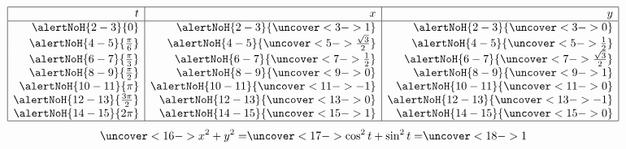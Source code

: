 \begin{frame}
\begin{example}
\begin{columns}[c]
\[
\begin{array}{|r|r|r|}
\hline
t & x & y\\
\hline
\alertNoH{ 2-3}{0} &%
\alertNoH{ 2-3}{\uncover<3->{1}} &%
\alertNoH{ 2-3}{\uncover<3->{0}} \\%
\alertNoH{ 4-5}{\frac{\pi}6} &%
\alertNoH{ 4-5}{\uncover<5->{\frac{\sqrt{3}}{2}}} &%
\alertNoH{ 4-5}{\uncover<5->{\frac12}} \\%
\alertNoH{ 6-7}{\frac{\pi}3} &%
\alertNoH{ 6-7}{\uncover<7->{\frac12}} &%
\alertNoH{ 6-7}{\uncover<7->{\frac{\sqrt{3}}2}} \\%
\alertNoH{ 8-9}{\frac{\pi}2} &%
\alertNoH{ 8-9}{\uncover<9->{0}} &%
\alertNoH{ 8-9}{\uncover<9->{1}} \\%
\alertNoH{ 10-11}{\pi} &%
\alertNoH{ 10-11}{\uncover<11->{-1}} &%
\alertNoH{ 10-11}{\uncover<11->{0}} \\%
\alertNoH{ 12-13}{\frac{3\pi}2} &%
\alertNoH{ 12-13}{\uncover<13->{0}} &%
\alertNoH{ 12-13}{\uncover<13->{-1}} \\%
\alertNoH{ 14-15}{2\pi} &%
\alertNoH{ 14-15}{\uncover<15->{1}} &%
\alertNoH{ 14-15}{\uncover<15->{0}} \\%
\hline
\end{array}
\]
\abovedisplayskip=2pt
\belowdisplayskip=2pt
\[
\uncover<16->{%
x^2 + y^2 = %
}%
\uncover<17->{%
\cos^2 t+ \sin^2 t = %
}%
\uncover<18->{%
1%
}%
\]
%
\end{columns}
\end{example}
\end{frame}
